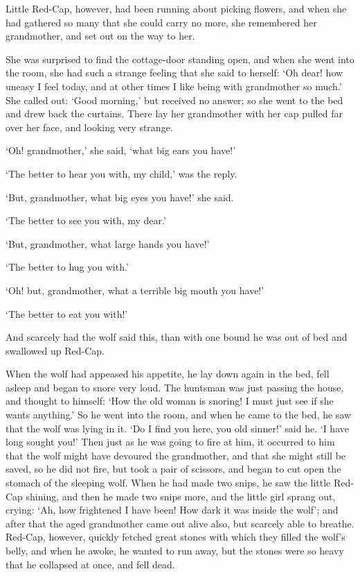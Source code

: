 \documentclass[oneside,11pt]{book} %
\begin{document}
Little Red-Cap, however, had been running about picking flowers, and when she had gathered so many that she could carry no more, she remembered her grandmother, and set out on the way to her.

She was surprised to find the cottage-door standing open, and when she went into the room, she had such a strange feeling that she said to herself: `Oh dear! how uneasy I feel today, and at other times I like being with grandmother so much.' She called out: `Good morning,' but received no answer; so she went to the bed and drew back the curtains. There lay her grandmother with her cap pulled far over her face, and looking very strange.

`Oh! grandmother,' she said, `what big ears you have!'

`The better to hear you with, my child,' was the reply.

`But, grandmother, what big eyes you have!' she said.

`The better to see you with, my dear.'

`But, grandmother, what large hands you have!'

`The better to hug you with.'

`Oh! but, grandmother, what a terrible big mouth you have!'

`The better to eat you with!'

And scarcely had the wolf said this, than with one bound he was out of bed and swallowed up Red-Cap.

When the wolf had appeased his appetite, he lay down again in the bed, fell asleep and began to snore very loud. The huntsman was just passing the house, and thought to himself: `How the old woman is snoring! I must just see if she wants anything.' So he went into the room, and when he
came to the bed, he saw that the wolf was lying in it. `Do I find you here, you old sinner!' said he. `I have long sought you!' Then just as he was going to fire at him, it occurred to him that the wolf might have devoured the grandmother, and that she might still be saved, so he did not fire, but took a pair of scissors, and began to cut open the stomach of the sleeping wolf. When he had made two snips, he saw the little Red-Cap shining, and then he made two snips more, and the little girl sprang out, crying: `Ah, how frightened I have been! How dark it was inside the wolf'; and after that the aged grandmother came out alive also, but scarcely able to breathe. Red-Cap, however, quickly fetched
great stones with which they filled the wolf's belly, and when he awoke, he wanted to run away, but the stones were so heavy that he collapsed at once, and fell dead.
\end{document}
